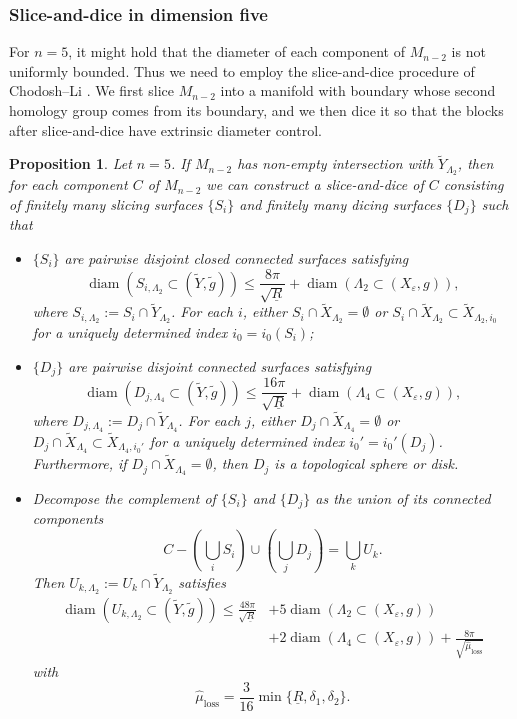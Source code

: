 \documentclass[11pt,letterpaper]{amsart}
\numberwithin{equation}{section}
\newtheorem{proposition}[theorem]{Proposition}
\theoremstyle{definition}
\DeclareMathOperator{\diam}{diam}
\newcommand{\ve}{\varepsilon}
\begin{document}
\subsubsection{Slice-and-dice in dimension five}
For $n=5$, it might hold that the diameter of each component
of $M_{n-2}$ is {not uniformly bounded}. Thus we need to employ the slice-and-dice procedure of Chodosh--Li \cite[Section 6]{CL20}. We first slice $M_{n-2}$ into a manifold with boundary whose second homology group comes from its boundary, and we then dice it so that the blocks after slice-and-dice have extrinsic diameter control.
\begin{proposition}\label{Prop: slice and dice}
Let $n=5$. If $M_{n-2}$ has non-empty intersection with $\tilde Y_{\Lambda_2}$, then for each component $C$ of $M_{n-2}$ we can construct a slice-and-dice of $C$ consisting of finitely many slicing surfaces $\{S_i\}$ and finitely many dicing surfaces $\{D_j\}$ such that
\begin{itemize}\setlength{\itemsep}{1mm}
\item $\{S_i\}$ are pairwise disjoint closed {connected} surfaces satisfying
$$
\diam(S_{i,\Lambda_2}\subset (\tilde Y,\tilde g))\leq \frac{8\pi}{\sqrt{\underline R}}+\diam(\Lambda_2\subset(X_\ve,g)),
$$
where $S_{i,\Lambda_2}:=S_i\cap \tilde Y_{\Lambda_2}$. {For each $i$, either $S_i\cap \tilde X_{\Lambda_2}=\emptyset$ or $S_i\cap \tilde X_{\Lambda_2}\subset \tilde X_{\Lambda_2,i_0}$ for a uniquely determined index $i_0=i_0(S_i)$};
\item $\{D_j\}$ are pairwise disjoint {connected} surfaces satisfying
$$
\diam(D_{j,\Lambda_4}\subset (\tilde Y,\tilde g))\leq \frac{16\pi}{\sqrt{\underline R}}+\diam(\Lambda_4\subset(X_\ve,g)),
$$
where $D_{j,\Lambda_4}:=D_j\cap \tilde Y_{\Lambda_4}$. {For each $j$, either $D_j\cap \tilde X_{\Lambda_4}=\emptyset$ or $D_j\cap \tilde X_{\Lambda_4}\subset \tilde X_{\Lambda_4,i_0'}$ for a uniquely determined index $i_0'=i_0'(D_j)$.}
Furthermore, if $D_j \cap \tilde{X}_{\Lambda_4} = \emptyset$, then $D_j$ is a topological sphere or disk.
\item Decompose the complement of $\{S_i\}$ and $\{D_j\}$ as the union of its connected components
$$
C-\left(\bigcup_i S_i\right)\cup\left(\bigcup_j D_j\right)=\bigcup_k U_k.
$$
Then $U_{k,\Lambda_2}:=U_k\cap \tilde Y_{\Lambda_2}$ satisfies
\[
\begin{split}
\diam(U_{k,\Lambda_2}\subset(\tilde Y,\tilde g))\leq \frac{48\pi}{\sqrt{\underline R}} & +5\diam(\Lambda_2\subset(X_\ve,g))\\
&+2\diam(\Lambda_4\subset(X_\ve,g))+\frac{8\pi}{\sqrt{\hat \mu_{\mathrm{loss}}}}
\end{split}
\]
with
$$
\hat \mu_{\mathrm{loss}}=\frac{3}{16}\min\{\underline R,\delta_1,\delta_2\}.
$$
\end{itemize}
\end{proposition}
\end{document}
